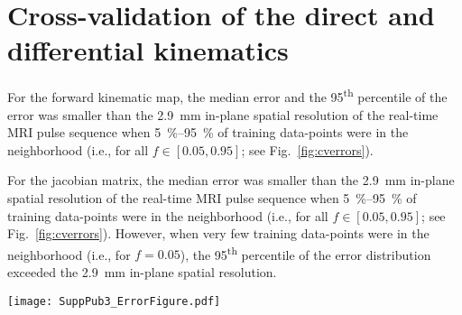 \documentclass[reprint]{JASAnew}\usepackage[]{graphicx}\usepackage[]{color}
\begin{document}
\section{Cross-validation of the direct and differential kinematics}
\label{sec:crossvalidation}

For the forward kinematic map, the median error and the 95\textsuperscript{th} percentile of the error was smaller than the \SI{2.9}{\milli\meter} in-plane spatial resolution of the real-time MRI pulse sequence when \SIrange{5}{95}{\percent} of training data-points were in the neighborhood (i.e., for all $f\in \left[ 0.05, 0.95\right]$; see Fig.~\ref{fig:cverrors}). 

For the jacobian matrix, the median error was smaller than the \SI{2.9}{\milli\meter} in-plane spatial resolution of the real-time MRI pulse sequence when \SIrange{5}{95}{\percent} of training data-points were in the neighborhood (i.e., for all $f\in \left[ 0.05, 0.95\right]$; see Fig.~\ref{fig:cverrors}). However, when very few training data-points were in the neighborhood (i.e., for $f=0.05$), the 95\textsuperscript{th} percentile of the error distribution exceeded the \SI{2.9}{\milli\meter} in-plane spatial resolution. 

\begin{figure*}
\raggedright
\texttt{[image: SuppPub3\_ErrorFigure.pdf]}
\caption{
{\bf (a)} Median error (line) and 10\textsuperscript{th}-90\textsuperscript{th} percentile error range (shaded) of the forward kinematic map estimator of constriction task variables. {\bf (b)} Median error (line) and 10\textsuperscript{th}-90\textsuperscript{th} percentile error range (shaded) of the jacobian matrix estimator of frame-to-frame finite differences in constriction task variables. 
Data-points are the errors computed over all 10 folds of cross-validation.
Neighborhood size is given as percentage of training data-points.
The standard deviation of observed (frame-to-frame finite differences in) constriction task variables is indicated as a dashed line whenever the standard deviation is small enough to fit within the $y$-axis limits.}
\label{fig:cverrors}
\end{figure*}
\end{document}
